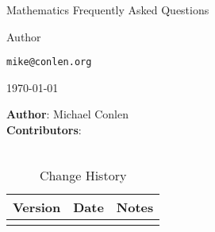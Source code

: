 \documentclass[oneside]{book}
\begin{document}
\fancyhf{} 
\renewcommand{\headrulewidth}{0pt}
\fancyfoot[C]{\thepage}

\frontmatter
\begin{titlepage}
	\vspace{1 in}
	\centering
	{\LARGE {Mathematics Frequently Asked Questions}\par}
	\vspace{1 cm}
	Author\par 
	\texttt{mike@conlen.org}\par
	\vspace{1 cm}
	\today
\end{titlepage}

\thispagestyle{empty}
\textbf{Author}: Michael Conlen \\

\textbf{Contributors}:  \\
\\

\begin{table}[ht]
	\begin{tabular}{l l l}
		\toprule
		Version & Date & Notes \\
		\hline
		&& \\
		\bottomrule
	\end{tabular}
	\caption{Change History}\label{tab:history}
\end{table}

\tableofcontents
\end{document}
